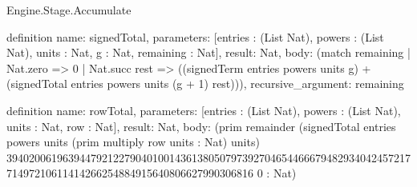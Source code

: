 \begin{lexlean}{Engine.Stage.Accumulate}
\begin{semanticmodule}
definition{
  name: signedTotal,
  parameters: [entries : (List Nat), powers : (List Nat), units : Nat, g : Nat, remaining : Nat],
  result: Nat,
  body: (match remaining
    | Nat.zero => 0
    | Nat.succ rest => ((signedTerm entries powers units g) + (signedTotal entries powers units (g + 1) rest))),
  recursive_argument: remaining
}

definition{
  name: rowTotal,
  parameters: [entries : (List Nat), powers : (List Nat), units : Nat, row : Nat],
  result: Nat,
  body: (prim remainder (signedTotal entries powers units (prim multiply row units : Nat) units) 39402006196394479212279040100143613805079739270465446667948293404245721771497210611414266254884915640806627990306816 0 : Nat)
}
\end{semanticmodule}
\end{lexlean}
